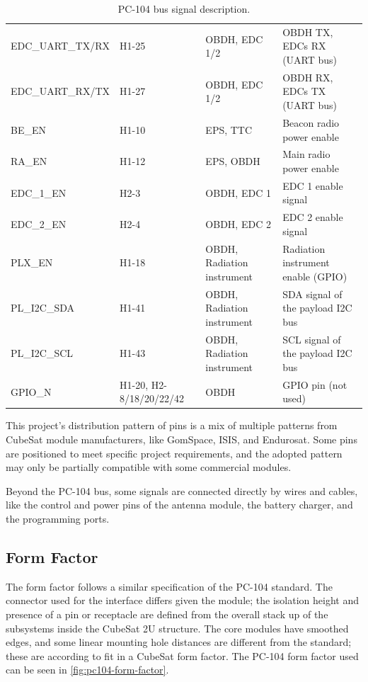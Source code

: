 \begin{table}[!h]
\begin{tabular}{lL{0.18\textwidth}L{0.19\textwidth}L{0.33\textwidth}}
        EDC\_UART\_TX/RX & H1-25           & OBDH, EDC 1/2        & OBDH TX, EDCs RX (UART bus) \\
        EDC\_UART\_RX/TX & H1-27           & OBDH, EDC 1/2        & OBDH RX, EDCs TX (UART bus) \\
        BE\_EN           & H1-10           & EPS, TTC             & Beacon radio power enable \\
        RA\_EN           & H1-12           & EPS, OBDH            & Main radio power enable \\
        EDC\_1\_EN       & H2-3            & OBDH, EDC 1          & EDC 1 enable signal \\
        EDC\_2\_EN       & H2-4            & OBDH, EDC 2          & EDC 2 enable signal \\
        PLX\_EN          & H1-18           & OBDH, Radiation instrument      & Radiation instrument enable (GPIO) \\
        PL\_I2C\_SDA     & H1-41           & OBDH, Radiation instrument      & SDA signal of the payload I2C bus \\
        PL\_I2C\_SCL     & H1-43           & OBDH, Radiation instrument      & SCL signal of the payload I2C bus \\
        GPIO\_N          & H1-20, H2-8/18/20/22/42  & OBDH        & GPIO pin (not used) \\
        \bottomrule[1.5pt]
    \end{tabular}
    \caption{PC-104 bus signal description.}
    \label{tab:pc104-signals}
\end{table}

This project's distribution pattern of pins is a mix of multiple patterns from CubeSat module manufacturers, like GomSpace, ISIS, and Endurosat. Some pins are positioned to meet specific project requirements, and the adopted pattern may only be partially compatible with some commercial modules.

Beyond the PC-104 bus, some signals are connected directly by wires and cables, like the control and power pins of the antenna module, the battery charger, and the programming ports.

\subsection{Form Factor}

The form factor follows a similar specification of the PC-104 standard\cite{pc104-specification}.
The connector used for the interface differs given the module; the isolation height and presence of a pin or receptacle are defined from the overall stack up of the subsystems inside the CubeSat 2U structure.
The core modules have smoothed edges, and some linear mounting hole distances are different from the standard; these are according to fit in a CubeSat form factor.
The PC-104 form factor used can be seen in \autoref{fig:pc104-form-factor}.

